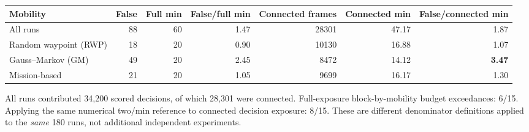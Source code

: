 \documentclass[10pt,a4paper]{article}
\begin{document}
\begin{center}
\small
\setlength{\tabcolsep}{4pt}
\begin{adjustbox}{max width=\linewidth}\begin{tabular}{lrrrrrr}
\toprule
Mobility & False & Full min & False/full min & Connected frames & Connected min & False/connected min \\
\midrule
All runs & 88 & 60 & 1.47 & 28301 & 47.17 & 1.87 \\
Random waypoint (RWP) & 18 & 20 & 0.90 & 10130 & 16.88 & 1.07 \\
Gauss--Markov (GM) & 49 & 20 & 2.45 & 8472 & 14.12 & \textbf{3.47} \\
Mission-based & 21 & 20 & 1.05 & 9699 & 16.17 & 1.30 \\
\bottomrule
\end{tabular}\end{adjustbox}
\end{center}

\medskip
\noindent All runs contributed 34,200 scored decisions, of which 28,301 were connected. Full-exposure block-by-mobility budget exceedances: 6/15. Applying the same numerical two/min reference to connected decision exposure: 8/15. These are different denominator definitions applied to the \emph{same} 180 runs, not additional independent experiments.
\end{document}
